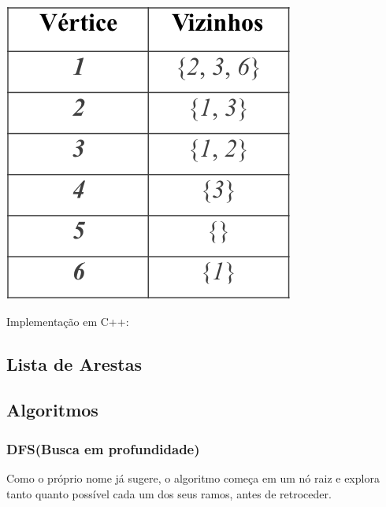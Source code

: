 \documentclass[a4paper,12pt]{article}
\begin{document}
\begin{center}
  \includegraphics[width=\linewidth/2]{figures/grafos/representacao_lista_adj.png}
\end{center}

\noindent Implementação em C++:


\subsection{Lista de Arestas}

\subsection{Algoritmos}
\subsubsection{DFS(Busca em profundidade)}

Como o próprio nome já sugere, o algoritmo começa em um nó raiz e explora tanto quanto possível cada um dos seus ramos, antes de retroceder.

\end{document}
